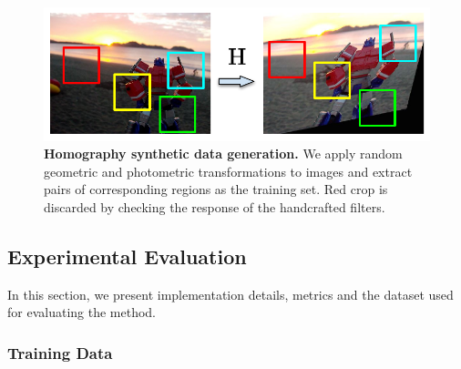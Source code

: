 \begin{figure}
 \hspace*{-0.1cm} 
 \vspace{-0.4cm}
    \centering
    \includegraphics[width=\linewidth]{main/chapter02/figures/dataset_v3.pdf}
    \vspace{-0.0cm}
    \caption[Homography synthetic data generation]{\textbf{Homography synthetic data generation.} We apply random geometric and photometric transformations to images and extract pairs of corresponding regions as the training set. Red crop is discarded by checking the response of the handcrafted filters.}
    \label{fig:dataset}
\end{figure}

\subsection{Experimental Evaluation}
\label{keynet_sec:experimental_evaluation}


In this section, we present implementation details, metrics and the dataset used for evaluating the method.

\subsubsection{Training Data}
\label{sec:create_dataset}

